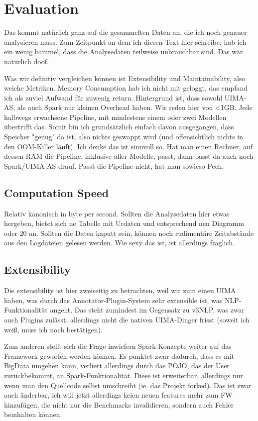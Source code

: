 \chapter{Evaluation}
Das kommt natürlich ganz auf die gesammelten Daten an, die ich noch genauer analysieren muss. Zum Zeitpunkt an dem ich diesen Text hier schreibe, hab ich ein wenig bammel, dass die Analysedaten teilweise unbrauchbar sind. Das wär natürlich doof. 

Was wir definitiv vergleichen können ist Extensibility und Maintainability, also weiche Metriken. Memory Consumption hab ich nicht mit geloggt, das empfand ich als zuviel Aufwand für zuwenig return. Hintergrund ist, dass sowohl UIMA-AS, als auch Spark nur kleinen Overhead haben. Wir reden hier von <1GB. Jede halbwegs erwachsene Pipeline, mit mindestens einem oder zwei Modellen übertrifft das. Somit bin ich grundsätzlich einfach davon ausgegangen, dass Speicher "genug" da ist, also nichts geswappt wird (und offensichtlich nichts in den OOM-Killer läuft). Ich denke das ist sinnvoll so. Hat man einen Rechner, auf dessen RAM die Pipeline, inklusive aller Modelle, passt, dann passt da auch noch Spark/UIMA-AS drauf. Passt die Pipeline nicht, hat man sowieso Pech.

\section{Computation Speed}

Relativ kanonisch in byte per second. Sollten die Analysedaten hier etwas hergeben, bietet sich ne Tabelle mit Urdaten und entsprechend nen Diagramm oder 20 an. Sollten die Daten kaputt sein, können noch rudimentäre Zeitabstände aus den Logdateien gelesen werden. Wie sexy das ist, ist allerdings fraglich.

\section{Extensibility}

Die extensibility ist hier zweiseitig zu betrachten, weil wir zum einen UIMA haben, was durch das Annotator-Plugin-System sehr extensible ist, was NLP-Funktionalität angeht. Das steht zumindest im Gegensatz zu v3NLP, was zwar auch Plugins zulässt, allerdings nicht die nativen UIMA-Dinger frisst (soweit ich weiß, muss ich noch bestätigen).

Zum anderen stellt sich die Frage inwiefern Spark-Konzepte weiter auf das Framework geworfen werden können. Es punktet zwar dadurch, dass es mit BigData umgehen kann, verliert allerdings durch das POJO, das der User zurückbekommt, an Spark-Funktionalität. Diese ist erweiterbar, allerdings nur wenn man den Quellcode selbst umschreibt (ie. das Projekt forked). Das ist zwar auch änderbar, ich will jetzt allerdings keien neuen features mehr zum FW hinzufügen, die nicht nur die Benchmarks invalidieren, sondern auch Fehler beinhalten können.

